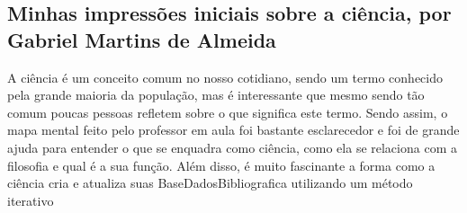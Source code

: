 \subsection{Minhas impressões iniciais sobre a ciência, por Gabriel Martins de Almeida}

 A ciência \citet{wikipedia_ciencia_2022} é um conceito comum no nosso cotidiano, sendo um termo conhecido pela grande maioria da população, mas é interessante que mesmo sendo tão comum poucas pessoas refletem sobre o que significa este termo. Sendo assim, o mapa mental feito pelo professor em aula foi bastante esclarecedor e foi de grande ajuda para entender o que se enquadra como ciência, como ela se relaciona com a filosofia e qual é a sua função. 
 Além disso, é muito fascinante a forma como a ciência cria e atualiza suas \gls{BaseDadosBibliografica} utilizando um método iterativo 